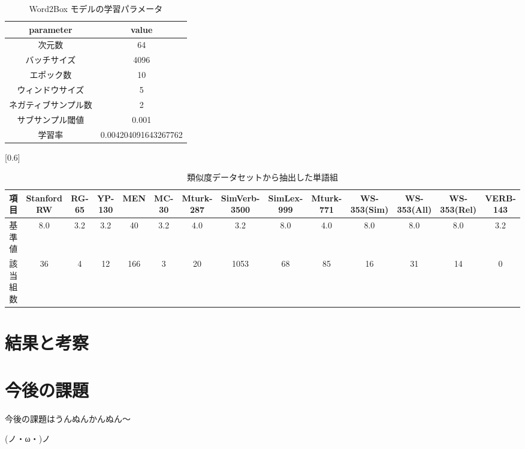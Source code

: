 \documentclass[twocolumn]{jarticle}     %
\begin{document}
\begin{table}[t]
  \centering
  \caption{Word2Box モデルの学習パラメータ}
  \label{tb:model_parameter}
  \begin{tabular}{|c|c|} \hline
      parameter&value \\ \hline
      次元数&64 \\
      バッチサイズ&4096 \\ 
      エポック数&10 \\
      ウィンドウサイズ&5 \\
      ネガティブサンプル数&2 \\
      サブサンプル閾値&0.001 \\
      学習率&0.004204091643267762 \\
      \hline
  \end{tabular}
\end{table}


\begin{table*}[th]
  \centering
  \caption{類似度データセットから抽出した単語組}
  \label{tb:dataset_detail}
  \scalebox{0.6}[0.6]{
		\begin{tabular}{|c|c|c|c|c|c|c|c|c|c|c|c|c|c|}
			\hline
			項目   & Stanford RW & RG-65 & YP-130 & MEN & MC-30 & Mturk-287 & SimVerb-3500 & SimLex-999 & Mturk-771 & WS-353(Sim) & WS-353(All) & WS-353(Rel) & VERB-143 \\ \hline
			基準値  & 8.0         & 3.2   & 3.2    & 40  & 3.2   & 4.0       & 3.2          & 8.0        & 4.0       & 8.0         & 8.0         & 8.0         & 3.2      \\ \hline
			該当組数 & 36          & 4     & 12     & 166 & 3     & 20        & 1053         & 68         & 85        & 16          & 31          & 14          & 0        \\ \hline
			\end{tabular}
  }
\end{table*}

\section{結果と考察}

\section{今後の課題}
今後の課題はうんぬんかんぬん〜

(ノ・ω・)ノ  

\end{document}
